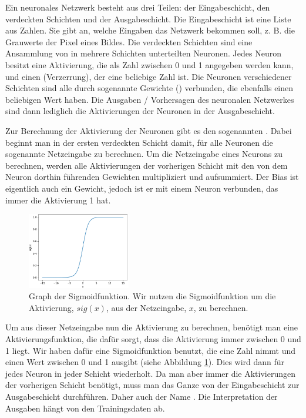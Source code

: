 \documentclass[11pt]{scrartcl}
\begin{document}
	Ein neuronales Netzwerk besteht aus drei Teilen: der Eingabeschicht, den verdeckten Schichten und der Ausgabeschicht. 
	Die Eingabeschicht ist eine Liste aus Zahlen. Sie gibt an, welche Eingaben das Netzwerk bekommen soll, z. B. die Grauwerte der Pixel eines Bildes.
	Die verdeckten Schichten sind eine Ansammlung von in mehrere Schichten unterteilten Neuronen.
	Jedes Neuron besitzt eine Aktivierung, die als Zahl zwischen 0 und 1 angegeben werden kann, und einen  (Verzerrung), der eine beliebige Zahl ist. Die Neuronen verschiedener Schichten sind alle durch sogenannte Gewichte () verbunden, die ebenfalls einen beliebigen Wert haben.
	Die Ausgaben / Vorhersagen des neuronalen Netzwerkes sind dann lediglich die Aktivierungen der Neuronen in der Ausgabeschicht.
	\newpage
	 \label{forward-prop}

	Zur Berechnung der Aktivierung der Neuronen gibt es den sogenannten . Dabei beginnt man in der ersten verdeckten Schicht damit, für alle Neuronen die sogenannte Netzeingabe zu berechnen. Um die Netzeingabe eines Neurons zu berechnen, werden alle Aktivierungen der vorherigen Schicht mit den von dem Neuron dorthin führenden Gewichten multipliziert und aufsummiert. Der Bias ist eigentlich auch ein Gewicht, jedoch ist er mit einem Neuron verbunden, das immer die Aktivierung 1 hat.

	\begin{figure}
		\centering
		\vspace*{-5mm}
		\includegraphics[width=0.4\textwidth]{pictures/sig_func.png}
		\caption{Graph der Sigmoidfunktion. Wir nutzen die Sigmoidfunktion um die Aktivierung, $sig(x)$, aus der Netzeingabe, $x$, zu berechnen.}
		\label{sig_func}
	\end{figure}

	Um aus dieser Netzeingabe nun die Aktivierung zu berechnen, benötigt man eine Aktivierungsfunktion, die dafür sorgt, dass die Aktivierung immer zwischen 0 und 1 liegt. Wir haben dafür eine Sigmoidfunktion benutzt, die eine Zahl nimmt und einen Wert zwischen 0 und 1 ausgibt (siehe Abbildung \ref{sig_func}). Dies wird dann für jedes Neuron in jeder Schicht wiederholt. Da man aber immer die Aktivierungen der vorherigen Schicht benötigt, muss man das Ganze von der Eingabeschicht zur Ausgabeschicht durchführen. Daher auch der Name . Die Interpretation der Ausgaben hängt von den Trainingsdaten ab.
	
\end{document}
